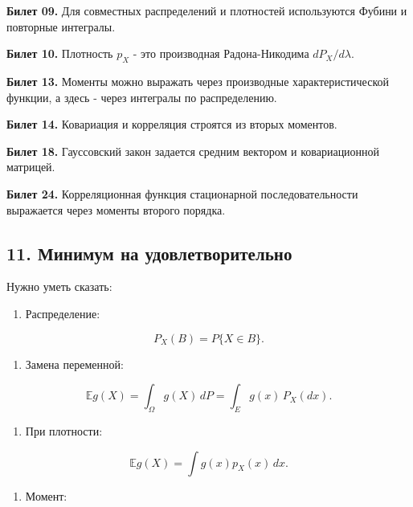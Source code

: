\documentclass[
  11pt,
  a4paper,
]{article}
\providecommand{\tightlist}{%
  \setlength{\itemsep}{0pt}\setlength{\parskip}{0pt}}
\begin{document}
\textbf{Билет 09.} Для совместных распределений и плотностей
используются Фубини и повторные интегралы.

\textbf{Билет 10.} Плотность \(p_X\) - это производная Радона-Никодима
\(dP_X/d\lambda\).

\textbf{Билет 13.} Моменты можно выражать через производные
характеристической функции, а здесь - через интегралы по распределению.

\textbf{Билет 14.} Ковариация и корреляция строятся из вторых моментов.

\textbf{Билет 18.} Гауссовский закон задается средним вектором и
ковариационной матрицей.

\textbf{Билет 24.} Корреляционная функция стационарной
последовательности выражается через моменты второго порядка.

\subsection{11. Минимум на
удовлетворительно}\label{ux43cux438ux43dux438ux43cux443ux43c-ux43dux430-ux443ux434ux43eux432ux43bux435ux442ux432ux43eux440ux438ux442ux435ux43bux44cux43dux43e}

Нужно уметь сказать:

\begin{enumerate}
\def\labelenumi{\arabic{enumi}.}
\tightlist
\item
  Распределение:
\end{enumerate}

\[
P_X(B)=P\{X\in B\}.
\]

\begin{enumerate}
\def\labelenumi{\arabic{enumi}.}
\setcounter{enumi}{1}
\tightlist
\item
  Замена переменной:
\end{enumerate}

\[
\mathbb E g(X)
=
\int_\Omega g(X)\,dP
=
\int_E g(x)\,P_X(dx).
\]

\begin{enumerate}
\def\labelenumi{\arabic{enumi}.}
\setcounter{enumi}{2}
\tightlist
\item
  При плотности:
\end{enumerate}

\[
\mathbb E g(X)=\int g(x)p_X(x)\,dx.
\]

\begin{enumerate}
\def\labelenumi{\arabic{enumi}.}
\setcounter{enumi}{3}
\tightlist
\item
  Момент:
\end{enumerate}
\end{document}
